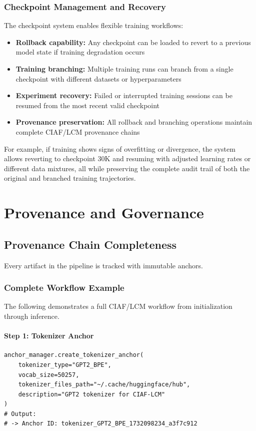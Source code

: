 \documentclass[11pt,a4paper]{article}
\begin{document}
\subsubsection{Checkpoint Management and Recovery}
The checkpoint system enables flexible training workflows:
\begin{itemize}
    \item \textbf{Rollback capability:} Any checkpoint can be loaded to revert to a previous model state if training degradation occurs
    \item \textbf{Training branching:} Multiple training runs can branch from a single checkpoint with different datasets or hyperparameters
    \item \textbf{Experiment recovery:} Failed or interrupted training sessions can be resumed from the most recent valid checkpoint
    \item \textbf{Provenance preservation:} All rollback and branching operations maintain complete CIAF/LCM provenance chains
\end{itemize}

For example, if training shows signs of overfitting or divergence, the system allows reverting to checkpoint 30K and resuming with adjusted learning rates or different data mixtures, all while preserving the complete audit trail of both the original and branched training trajectories.

\section{Provenance and Governance}

\subsection{Provenance Chain Completeness}
Every artifact in the pipeline is tracked with immutable anchors.

\subsubsection{Complete Workflow Example}
The following demonstrates a full CIAF/LCM workflow from initialization through inference.

\paragraph{Step 1: Tokenizer Anchor}
 
\begin{lstlisting}[style=ciafpython, backgroundcolor=\color{blue!5}]
anchor_manager.create_tokenizer_anchor(
    tokenizer_type="GPT2_BPE",
    vocab_size=50257,
    tokenizer_files_path="~/.cache/huggingface/hub",
    description="GPT2 tokenizer for CIAF-LCM"
)
# Output:
# -> Anchor ID: tokenizer_GPT2_BPE_1732098234_a3f7c912
\end{lstlisting}
\end{document}
